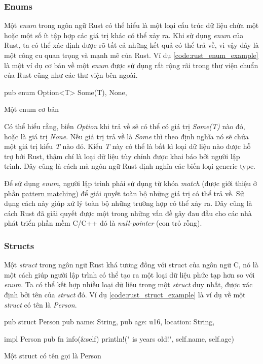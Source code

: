 \subsubsection{Enums}
Một \emph{enum} trong ngôn ngữ Rust có thể hiểu là một loại cấu trúc dữ liệu chứa một hoặc một số ít tập hợp các giá trị khác có thể xảy ra.
Khi sử dụng \emph{enum} của Rust, ta có thể xác định được rõ tất cả những kết quả có thể trả về, vì vậy đây là một công cu quan trọng và mạnh mẽ của Rust.
Ví dụ \ref{code:rust_enum_example} là một ví dụ cơ bản về một \emph{enum} được sử dụng rất rộng rãi trong thư viện chuẩn của Rust cũng như các thư viện bên ngoài.
\begin{listing}
\begin{rustcode}
pub enum Option<T> {
  Some(T),
  None,
}
\end{rustcode}
\caption{Một enum cơ bản}
\label{code:rust_enum_example}
\end{listing}

Có thể hiểu rằng, biến \emph{Option} khi trả về sẽ có thể có giá trị \emph{Some(T)} nào đó, hoặc là giá trị \emph{None}.
Nếu giá trị trả về là \emph{Some} thì theo định nghĩa nó sẽ chứa một giá trị kiểu \emph{T} nào đó.
Kiểu \emph{T} này có thể là bất kì loại dữ liệu nào được hỗ trợ bởi Rust, thậm chí là loại dữ liệu tùy chỉnh được khai báo bởi người lập trình.
Đây cũng là cách mà ngôn ngữ Rust định nghĩa các biến loại generic type.

Để sử dụng \emph{enum}, người lập trình phải sử dụng từ khóa \emph{match} (được giới thiệu ở phần \hyperref[pattern_matching]{pattern matching}) để giải quyết toàn bộ những giá trị có thể trả về.
Sử dụng cách này giúp xử lý toàn bộ những trường hợp có thể xảy ra.
Đây cũng là cách Rust đã giải quyết được một trong những vấn đề gây đau đầu cho các nhà phát triển phần mềm C/C++ đó là \emph{null-pointer} (con trỏ rỗng).

\subsubsection{Structs}
Một \emph{struct} trong ngôn ngữ Rust khá tương đồng với struct của ngôn ngữ C, nó là một cách giúp người lập trình có thể tạo ra một loại dữ liệu phức tạp hơn so với \emph{enum}.
Ta có thể kết hợp nhiều loại dữ liệu trong một \emph{struct} duy nhất, được xác định bởi tên của \emph{struct} đó.
Ví dụ \ref*{code:rust_struct_example} là ví dụ về một \emph{struct} có tên là \emph{Person}.

\begin{listing}
\begin{rustcode}
pub struct Person {
  pub name: String,
  pub age: u16,
  location: String,
}

impl Person {
  pub fn info(&self) {
    println!("{} is {} years old!", self.name, self.age)
  }
}
\end{rustcode}
\caption{Một struct có tên gọi là Person}
\label{code:rust_struct_example}
\end{listing}

